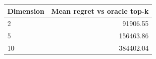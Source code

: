\begin{tabular}{lr}
\toprule
Dimension & Mean regret vs oracle top-k \\
\midrule
2 & 91906.55 \\
5 & 156463.86 \\
10 & 384402.04 \\
\bottomrule
\end{tabular}
